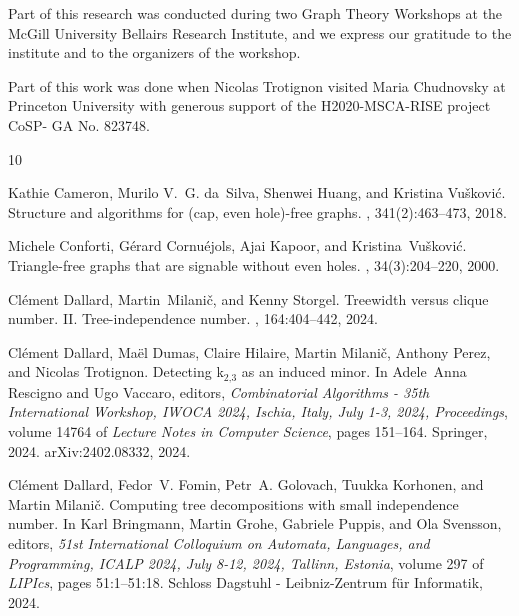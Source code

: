 \documentclass[11pt]{article}
\theoremstyle{definition}
\theoremstyle{definition}
\begin{document}
Part of this  research was conducted during two Graph Theory Workshops  at the McGill 
University Bellairs Research Institute, and we express our gratitude to the institute and to the organizers of the workshop.
 
 Part of this work was done when Nicolas Trotignon visited Maria Chudnovsky at Princeton University with generous support of the H2020-MSCA-RISE project CoSP- GA No. 823748.

%
%

\begin{thebibliography}{10}

Kathie Cameron, Murilo V.~G. da~Silva, Shenwei Huang, and {Kristina Vu\v
  skovi\'c}.
\newblock Structure and algorithms for (cap, even hole)-free graphs.
, 341(2):463--473, 2018.

Michele Conforti, G{\'{e}}rard Cornu{\'{e}}jols, Ajai Kapoor, and Kristina~Vu\v
  skovi\'c.
\newblock Triangle-free graphs that are signable without even holes.
, 34(3):204--220, 2000.

Cl{\'{e}}ment Dallard, Martin~Milani\v c, and Kenny Storgel.
\newblock Treewidth versus clique number. {II.} {T}ree-independence number.
, 164:404--442,
  2024.


Cl{\'{e}}ment Dallard, Ma{\"{e}}l Dumas, Claire Hilaire, Martin
Milani\v c,
  Anthony Perez, and Nicolas Trotignon.
\newblock Detecting k\({}_{\mbox{2,3}}\) as an induced minor.
\newblock In Adele~Anna Rescigno and Ugo Vaccaro, editors, {\em Combinatorial
  Algorithms - 35th International Workshop, {IWOCA} 2024, Ischia, Italy, July
  1-3, 2024, Proceedings}, volume 14764 of {\em Lecture Notes in Computer
  Science}, pages 151--164. Springer, 2024.
\newblock arXiv:2402.08332, 2024.


Cl{\'{e}}ment Dallard, Fedor~V. Fomin, Petr~A. Golovach, Tuukka Korhonen, and
  Martin Milani{\v c}.
\newblock Computing tree decompositions with small independence number.
\newblock In Karl Bringmann, Martin Grohe, Gabriele Puppis, and Ola Svensson,
  editors, {\em 51st International Colloquium on Automata, Languages, and
  Programming, {ICALP} 2024, July 8-12, 2024, Tallinn, Estonia}, volume 297 of
  {\em LIPIcs}, pages 51:1--51:18. Schloss Dagstuhl - Leibniz-Zentrum f{\"{u}}r
  Informatik, 2024.


\end{thebibliography}
\end{document}
